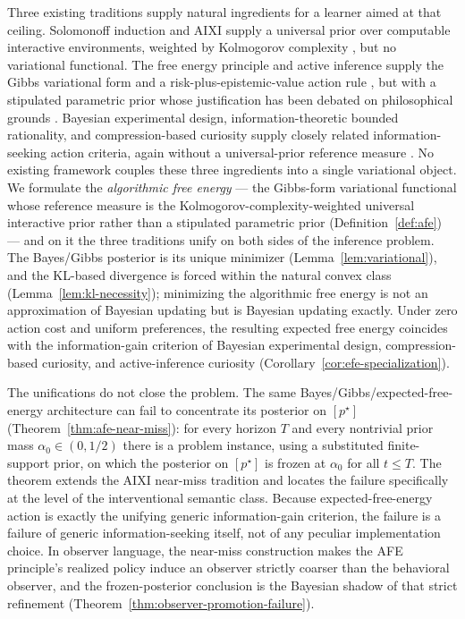 \documentclass[11pt]{article}
\theoremstyle{definition}
\theoremstyle{remark}
\begin{document}
Three existing traditions supply natural ingredients for a learner aimed at that ceiling. Solomonoff induction and AIXI supply a universal prior over computable interactive environments, weighted by Kolmogorov complexity \citep{Solomonoff1964a,Solomonoff1964b,Kolmogorov1965,Hutter2005}, but no variational functional. The free energy principle and active inference supply the Gibbs variational form and a risk-plus-epistemic-value action rule \citep{Friston2010,FristonEtAl2017Curiosity,ParrFriston2019}, but with a stipulated parametric prior whose justification has been debated on philosophical grounds \citep{ColombWright2021}. Bayesian experimental design, information-theoretic bounded rationality, and compression-based curiosity supply closely related information-seeking action criteria, again without a universal-prior reference measure \citep{Lindley1956,ChalonerVerdinelli1995,MacKay1992,OrtegaBraun2013,Schmidhuber1991,Schmidhuber2010}. No existing framework couples these three ingredients into a single variational object. We formulate the \emph{algorithmic free energy} --- the Gibbs-form variational functional whose reference measure is the Kolmogorov-complexity-weighted universal interactive prior rather than a stipulated parametric prior (Definition~\ref{def:afe}) --- and on it the three traditions unify on both sides of the inference problem. The Bayes/Gibbs posterior is its unique minimizer (Lemma~\ref{lem:variational}), and the KL-based divergence is forced within the natural convex class (Lemma~\ref{lem:kl-necessity}); minimizing the algorithmic free energy is not an approximation of Bayesian updating but is Bayesian updating exactly. Under zero action cost and uniform preferences, the resulting expected free energy coincides with the information-gain criterion of Bayesian experimental design, compression-based curiosity, and active-inference curiosity (Corollary~\ref{cor:efe-specialization}).

The unifications do not close the problem. The same Bayes/Gibbs/expected-free-energy architecture can fail to concentrate its posterior on $[p^\star]$ (Theorem~\ref{thm:afe-near-miss}): for every horizon $T$ and every nontrivial prior mass $\alpha_0\in(0,1/2)$ there is a problem instance, using a substituted finite-support prior, on which the posterior on $[p^\star]$ is frozen at $\alpha_0$ for all $t\le T$. The theorem extends the AIXI near-miss tradition \citep{LeikeHutter2015,Leike2016,LeikeEtAl2016} and locates the failure specifically at the level of the interventional semantic class. Because expected-free-energy action is exactly the unifying generic information-gain criterion, the failure is a failure of generic information-seeking itself, not of any peculiar implementation choice. In observer language, the near-miss construction makes the AFE principle's realized policy induce an observer strictly coarser than the behavioral observer, and the frozen-posterior conclusion is the Bayesian shadow of that strict refinement (Theorem~\ref{thm:observer-promotion-failure}).
\end{document}
